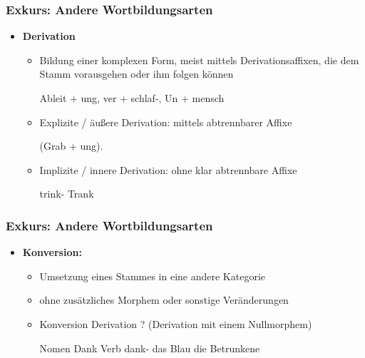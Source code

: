 \begin{frame}
\frametitle{Exkurs: Andere Wortbildungsarten}

\begin{itemize}
\item \textbf{Derivation}

\begin{itemize}
\item Bildung einer komplexen Form, meist mittels Derivationsaffixen, die dem Stamm vorausgehen oder ihm folgen können

\ea Ableit + ung, ver + schlaf-, Un + mensch
\z

\item Explizite / äußere Derivation: mittels abtrennbarer Affixe

\ea (Grab + ung).
\z

\item Implizite / innere Derivation: ohne klar abtrennbare Affixe

\ea trink- \vs Trank
\z

\end{itemize}
\end{itemize}

\end{frame}

\begin{frame}
\frametitle{Exkurs: Andere Wortbildungsarten}

\begin{itemize}
\item \textbf{Konversion:}

\begin{itemize}
\item Umsetzung eines Stammes in eine andere Kategorie
\item ohne zusätzliches Morphem oder sonstige Veränderungen
\item Konversion \ras Derivation ? (Derivation mit einem Nullmorphem)

\eal 
\ex Nomen Dank \vs Verb dank-
\ex das Blau
\ex die Betrunkene
\zl

\end{itemize}

\end{itemize}


\end{frame}


%
%
%
%
%


